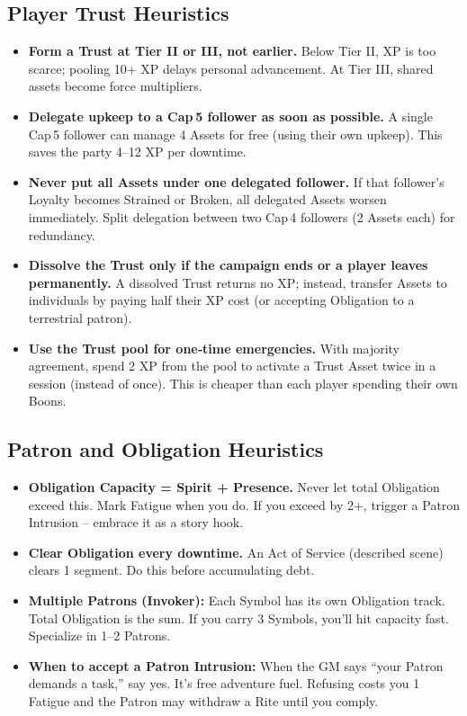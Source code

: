 \documentclass[11pt]{article}
\begin{document}
\subsection*{Player Trust Heuristics}
\begin{itemize}
  \item \textbf{Form a Trust at Tier II or III, not earlier.} Below Tier II, XP is too scarce; pooling 10+ XP delays personal advancement. At Tier III, shared assets become force multipliers.
  \item \textbf{Delegate upkeep to a Cap 5 follower as soon as possible.} A single Cap 5 follower can manage 4 Assets for free (using their own upkeep). This saves the party 4–12 XP per downtime.
  \item \textbf{Never put all Assets under one delegated follower.} If that follower’s Loyalty becomes Strained or Broken, all delegated Assets worsen immediately. Split delegation between two Cap 4 followers (2 Assets each) for redundancy.
  \item \textbf{Dissolve the Trust only if the campaign ends or a player leaves permanently.} A dissolved Trust returns no XP; instead, transfer Assets to individuals by paying half their XP cost (or accepting Obligation to a terrestrial patron).
  \item \textbf{Use the Trust pool for one‑time emergencies.} With majority agreement, spend 2 XP from the pool to activate a Trust Asset twice in a session (instead of once). This is cheaper than each player spending their own Boons.
\end{itemize}

\subsection*{Patron and Obligation Heuristics}

\begin{itemize}
    \item \textbf{Obligation Capacity = Spirit + Presence.} Never let total Obligation exceed this. Mark Fatigue when you do. If you exceed by 2+, trigger a Patron Intrusion – embrace it as a story hook.
    \item \textbf{Clear Obligation every downtime.} An Act of Service (described scene) clears 1 segment. Do this before accumulating debt.
    \item \textbf{Multiple Patrons (Invoker):} Each Symbol has its own Obligation track. Total Obligation is the sum. If you carry 3 Symbols, you'll hit capacity fast. Specialize in 1–2 Patrons.
    \item \textbf{When to accept a Patron Intrusion:} When the GM says ``your Patron demands a task,'' say yes. It's free adventure fuel. Refusing costs you 1 Fatigue and the Patron may withdraw a Rite until you comply.
\end{itemize}
\end{document}
